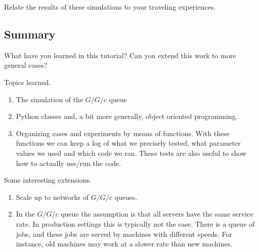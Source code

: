 \begin{exercise}
  Relate the results of these simulations to your traveling experiences.
\end{exercise}


\subsection{Summary}
\label{sec:summary}


\begin{exercise}
  What have you learned in this tutorial?
 Can you extend this work to more general cases?
\begin{solution}
    Topics learned.
    \begin{enumerate}
    \item The simulation of the $G/G/c$ queue
    \item Python classes and, a bit more generally, object oriented programming.
    \item Organizing cases and experiments by means of  functions. With these functions we can keep a log of what we precisely tested, what parameter values we used and which code we ran. These tests are also useful to show how to actually use/run the code.
    \end{enumerate}

Some  interesting extensions.
    \begin{enumerate}
    \item   Scale up to networks of $G/G/c$ queues.
    \item In the $G/G/c$ queue the assumption is that all servers have the same service rate.
      In production settings this is typically not the case.
      There is a queue of jobs, and these jobs are served by machines with different speeds.
      For instance, old machines may work at a slower rate than new machines.
    \end{enumerate}
  \end{solution}
\end{exercise}
